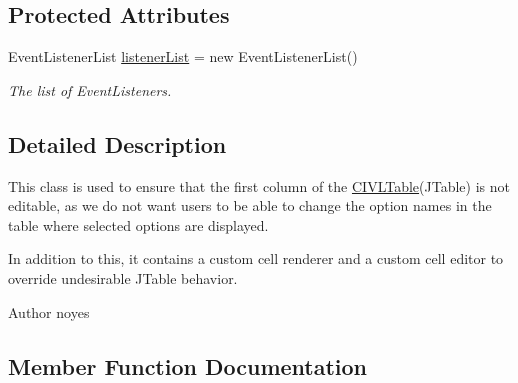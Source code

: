 \subsection*{Protected Attributes}
\begin{DoxyCompactItemize}
\item 
\hypertarget{classedu_1_1udel_1_1cis_1_1vsl_1_1civl_1_1gui_1_1common_1_1CIVLTable_a388b9ff4da24104fbc96edd035013990}{}Event\+Listener\+List \hyperlink{classedu_1_1udel_1_1cis_1_1vsl_1_1civl_1_1gui_1_1common_1_1CIVLTable_a388b9ff4da24104fbc96edd035013990}{listener\+List} = new Event\+Listener\+List()\label{classedu_1_1udel_1_1cis_1_1vsl_1_1civl_1_1gui_1_1common_1_1CIVLTable_a388b9ff4da24104fbc96edd035013990}

\begin{DoxyCompactList}\small\item\em The list of Event\+Listeners. \end{DoxyCompactList}\end{DoxyCompactItemize}


\subsection{Detailed Description}
This class is used to ensure that the first column of the {\ttfamily \hyperlink{classedu_1_1udel_1_1cis_1_1vsl_1_1civl_1_1gui_1_1common_1_1CIVLTable}{C\+I\+V\+L\+Table}}(J\+Table) is not editable, as we do not want users to be able to change the option names in the table where selected options are displayed. 

In addition to this, it contains a custom cell renderer and a custom cell editor to override undesirable J\+Table behavior.

\begin{DoxyAuthor}{Author}
noyes 
\end{DoxyAuthor}


\subsection{Member Function Documentation}
\hypertarget{classedu_1_1udel_1_1cis_1_1vsl_1_1civl_1_1gui_1_1common_1_1CIVLTable_a41c48015778719a8439d30819aed5e61}{}
